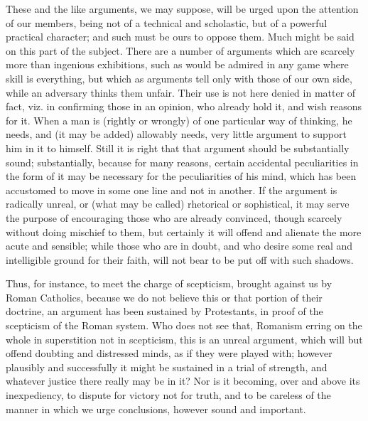 These and the like arguments, we may suppose,
will be urged upon the attention of our members, being not of a
technical and scholastic, but of a powerful practical character; and
such must be ours to oppose them. Much might be said on this part of
the subject. There are a number of arguments which are scarcely more
than ingenious exhibitions, such as would be admired in any game where
skill is everything, but which as arguments tell only with those of
our own side, while an adversary thinks them unfair. Their use is not
here denied in matter of fact, viz. in confirming those in an opinion,
who already hold it, and wish reasons for it. When a man is (rightly
or wrongly) of one particular way of thinking, he needs, and (it may
be added) allowably needs, very little argument to support him in it
to himself. Still it is right that that argument should be
substantially sound; substantially, because for many reasons, certain
accidental peculiarities in the form of it may be necessary for the
peculiarities of his mind, which has been accustomed to move in some
one line and not in another. If the argument is radically unreal, or
(what may be called) rhetorical or sophistical, it may serve the
purpose of encouraging those who are already convinced, though
scarcely without doing mischief to them, but certainly it will offend
and alienate the more acute and sensible; while those who are in
doubt, and who desire some real and intelligible ground for their
faith, will not bear to be put off with such shadows.

Thus, for instance, to meet the charge of
scepticism, brought against us by Roman Catholics, because we do not
believe this or that portion of their doctrine, an argument has been
sustained by Protestants, in proof of the scepticism of the Roman
system. Who does not see that, Romanism erring on the whole in
superstition not in scepticism, this is an unreal argument, which will
but offend doubting and distressed minds, as if they were played with;
however plausibly and successfully it might be sustained in a trial of
strength, and whatever justice there really may be in it? Nor is it
becoming, over and above its inexpediency, to dispute for victory not
for truth, and to be careless of the manner in which we urge
conclusions, however sound and important.

